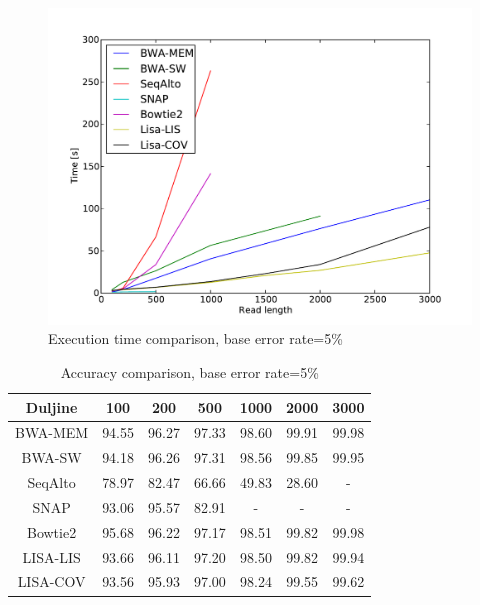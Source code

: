\documentclass[times, utf8, diplomski]{fer}
\begin{document}
\begin{figure}[H]
\centering
\includegraphics[width=1.0\textwidth]{../img/yersinia-e05-time.pdf}
\caption{Execution time comparison, base error rate=5\%}\label{yersinia-e05-time}
\end{figure}

\begin{table}[H]
\centering
\begin{tabular}{|c||c|c|c|c|c|c|}
\hline
	Duljine & 100 & 200 & 500 & 1000 & 2000 & 3000\\
\hline
\hline
	BWA-MEM & 94.55 & 96.27 & 97.33 & 98.60 & 99.91 & 99.98\\
\hline
	BWA-SW  & 94.18 & 96.26 & 97.31 & 98.56 & 99.85 & 99.95\\
\hline
	SeqAlto & 78.97 & 82.47 & 66.66 & 49.83 & 28.60 & -\\
\hline
	SNAP    & 93.06 & 95.57 & 82.91 & - & - & -\\
\hline
	Bowtie2 & 95.68 & 96.22 & 97.17 & 98.51 & 99.82 & 99.98\\
\hline
	LISA-LIS  & 93.66 & 96.11 & 97.20 & 98.50 & 99.82 & 99.94\\
\hline
	LISA-COV & 93.56 & 95.93 & 97.00 & 98.24 & 99.55 & 99.62\\
\hline
\end{tabular}
\caption{Accuracy comparison, base error rate=5\%}\label{yersinia-e05-correct}
\end{table}
\end{document}

